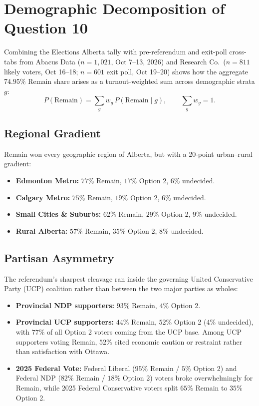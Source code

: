 \documentclass[11pt]{article}
\begin{document}
\section{Demographic Decomposition of Question 10}
\label{sec:demographics}
Combining the Elections Alberta tally with pre-referendum and exit-poll cross-tabs from Abacus Data ($n = 1{,}021$, Oct 7--13, 2026) and Research Co.\ ($n = 811$ likely voters, Oct 16--18; $n = 601$ exit poll, Oct 19--20) shows how the aggregate $74.95\%$ Remain share arises as a turnout-weighted sum across demographic strata $g$:
\begin{equation}
P(\text{Remain}) = \sum_{g} w_g\, P(\text{Remain} \mid g), \qquad \sum_g w_g = 1.
\label{eq:law-total-prob}
\end{equation}

\subsection{Regional Gradient}
Remain won every geographic region of Alberta, but with a 20-point urban--rural gradient:
\begin{itemize}
\item \textbf{Edmonton Metro:} $77\%$ Remain, $17\%$ Option 2, $6\%$ undecided.
\item \textbf{Calgary Metro:} $75\%$ Remain, $19\%$ Option 2, $6\%$ undecided.
\item \textbf{Small Cities \& Suburbs:} $62\%$ Remain, $29\%$ Option 2, $9\%$ undecided.
\item \textbf{Rural Alberta:} $57\%$ Remain, $35\%$ Option 2, $8\%$ undecided.
\end{itemize}

\subsection{Partisan Asymmetry}
The referendum's sharpest cleavage ran inside the governing United Conservative Party (UCP) coalition rather than between the two major parties as wholes:
\begin{itemize}
\item \textbf{Provincial NDP supporters:} $93\%$ Remain, $4\%$ Option 2.
\item \textbf{Provincial UCP supporters:} $44\%$ Remain, $52\%$ Option 2 ($4\%$ undecided), with $77\%$ of all Option 2 voters coming from the UCP base. Among UCP supporters voting Remain, $52\%$ cited economic caution or restraint rather than satisfaction with Ottawa.
\item \textbf{2025 Federal Vote:} Federal Liberal ($95\%$ Remain / $5\%$ Option 2) and Federal NDP ($82\%$ Remain / $18\%$ Option 2) voters broke overwhelmingly for Remain, while 2025 Federal Conservative voters split $65\%$ Remain to $35\%$ Option 2.
\end{itemize}
\end{document}
